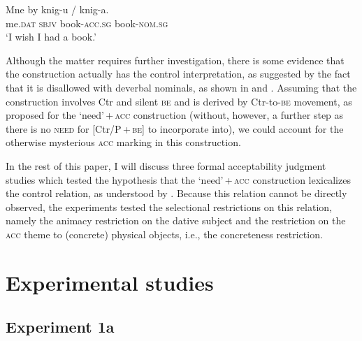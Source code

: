 \documentclass[output=paper]{langscibook}
\begin{document}
\ea \label{by}
\gll Mne by knig-u / \minsp{*} knig-a.\\
me.\textsc{dat} \textsc{sbjv} book-\textsc{acc.sg} {} {} book-\textsc{nom.sg}\\
\glt `I wish I had a book.'
\z

\noindent Although the matter requires further investigation, there is some evidence that the construction actually has the control interpretation, as suggested by the fact that it is disallowed with deverbal nominals, as shown in  and . Assuming that the construction involves Ctr and silent \textsc{be} and is derived by Ctr-to-\textsc{be} movement, as proposed for the `need'\,+\,\textsc{acc} construction (without, however, a further step as there is no \textsc{need} for [Ctr/P\,+\,\textsc{be}] to incorporate into), we could account for the otherwise mysterious \textsc{acc} marking in this construction.

\ea
{}
\z\z

\noindent In the rest of this paper, I will discuss three formal acceptability judgment studies which tested the hypothesis that the `need'\,+\,\textsc{acc} construction lexicalizes the control relation, as understood by \citet{Vikner.Jensen2002}. Because this relation cannot be directly observed, the experiments tested the selectional restrictions on this relation, namely the animacy restriction on the dative subject and the restriction on the \textsc{acc} theme to (concrete) physical objects, i.e., the concreteness restriction.

\section{Experimental studies\label{section-experiments}}

\subsection{Experiment 1a}
\end{document}
